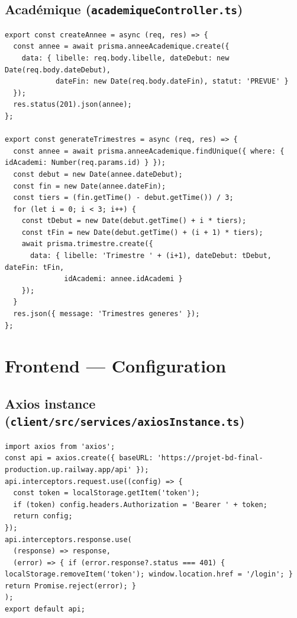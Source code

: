 \documentclass[12pt,a4paper]{article}
\begin{document}
\subsection{Académique (\texttt{academiqueController.ts})}

\begin{lstlisting}[style=code]
export const createAnnee = async (req, res) => {
  const annee = await prisma.anneeAcademique.create({
    data: { libelle: req.body.libelle, dateDebut: new Date(req.body.dateDebut),
            dateFin: new Date(req.body.dateFin), statut: 'PREVUE' }
  });
  res.status(201).json(annee);
};

export const generateTrimestres = async (req, res) => {
  const annee = await prisma.anneeAcademique.findUnique({ where: { idAcademi: Number(req.params.id) } });
  const debut = new Date(annee.dateDebut);
  const fin = new Date(annee.dateFin);
  const tiers = (fin.getTime() - debut.getTime()) / 3;
  for (let i = 0; i < 3; i++) {
    const tDebut = new Date(debut.getTime() + i * tiers);
    const tFin = new Date(debut.getTime() + (i + 1) * tiers);
    await prisma.trimestre.create({
      data: { libelle: 'Trimestre ' + (i+1), dateDebut: tDebut, dateFin: tFin,
              idAcademi: annee.idAcademi }
    });
  }
  res.json({ message: 'Trimestres generes' });
};
\end{lstlisting}

\newpage

\section{Frontend --- Configuration}

\subsection{Axios instance (\texttt{client/src/services/axiosInstance.ts})}

\begin{lstlisting}[style=code]
import axios from 'axios';
const api = axios.create({ baseURL: 'https://projet-bd-final-production.up.railway.app/api' });
api.interceptors.request.use((config) => {
  const token = localStorage.getItem('token');
  if (token) config.headers.Authorization = 'Bearer ' + token;
  return config;
});
api.interceptors.response.use(
  (response) => response,
  (error) => { if (error.response?.status === 401) { localStorage.removeItem('token'); window.location.href = '/login'; } return Promise.reject(error); }
);
export default api;
\end{lstlisting}
\end{document}
